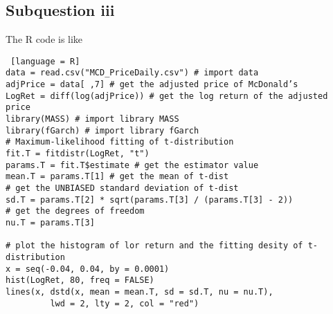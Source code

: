 \documentclass{article}
\DeclareMathOperator{\1}{\mathit{1}}
\numberwithin{figure}{section} %
\begin{document}
\subsection{Subquestion iii}

The R code is like

\begin{lstlisting} [language = R]
data = read.csv("MCD_PriceDaily.csv") # import data
adjPrice = data[ ,7] # get the adjusted price of McDonald’s
LogRet = diff(log(adjPrice)) # get the log return of the adjusted price
library(MASS) # import library MASS
library(fGarch) # import library fGarch
# Maximum-likelihood fitting of t-distribution
fit.T = fitdistr(LogRet, "t") 
params.T = fit.T$estimate # get the estimator value
mean.T = params.T[1] # get the mean of t-dist
# get the UNBIASED standard deviation of t-dist
sd.T = params.T[2] * sqrt(params.T[3] / (params.T[3] - 2)) 
# get the degrees of freedom
nu.T = params.T[3]

# plot the histogram of lor return and the fitting desity of t-distribution
x = seq(-0.04, 0.04, by = 0.0001)
hist(LogRet, 80, freq = FALSE)
lines(x, dstd(x, mean = mean.T, sd = sd.T, nu = nu.T),
         lwd = 2, lty = 2, col = "red")
\end{lstlisting}
\end{document}
